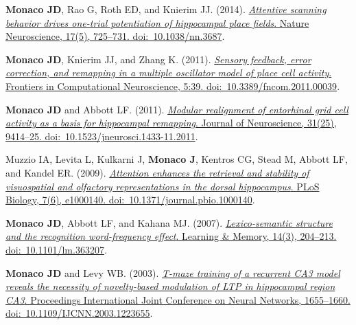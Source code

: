 \documentclass[10pt]{article}
\begin{document}
\begin{description}
\item \textbf{Monaco JD}, Rao G, Roth ED, and Knierim JJ. (2014). \href{http://dx.doi.org/10.1038/nn.3687}{\emph{Attentive scanning behavior drives one-trial potentiation of hippocampal place fields}. Nature Neuroscience, 17(5), 725--731. doi:~10.1038/nn.3687}.
\item \textbf{Monaco JD}, Knierim JJ, and Zhang K. (2011). \href{http://dx.doi.org/10.3389/fncom.2011.00039}{\emph{Sensory feedback, error correction, and remapping in a multiple oscillator model of place cell activity}. Frontiers in Computational Neuroscience, 5:39. doi:~10.3389/fncom.2011.00039}.
\item \textbf{Monaco JD} and Abbott LF. (2011). \href{http://dx.doi.org/10.1523/JNEUROSCI.1433-11.2011}{\emph{Modular realignment of entorhinal grid cell activity as a basis for hippocampal remapping}. Journal of Neuroscience, 31(25), 9414--25. doi:~10.1523/jneurosci.1433-11.2011}.
\item Muzzio IA, Levita L, Kulkarni J, \textbf{Monaco J}, Kentros CG, Stead M, Abbott LF, and Kandel ER. (2009). \href{http://dx.doi.org/10.1371/journal.pbio.1000140}{\emph{Attention enhances the retrieval and stability of visuospatial and olfactory representations in the dorsal hippocampus}. PLoS Biology, 7(6), e1000140. doi:~10.1371/journal.pbio.1000140}.
\item \textbf{Monaco JD}, Abbott LF, and Kahana MJ. (2007). \href{http://dx.doi.org/10.1101/lm.363207}{\emph{Lexico-semantic structure and the recognition word-frequency effect}. Learning \& Memory, 14(3), 204--213. doi:~10.1101/lm.363207}.
\item \textbf{Monaco JD} and Levy WB. (2003). \href{http://dx.doi.org/10.1109/IJCNN.2003.1223655}{\emph{T-maze training of a recurrent CA3 model reveals the necessity of novelty-based modulation of LTP in hippocampal region CA3}. Proceedings International Joint Conference on Neural Networks, 1655--1660. doi:~10.1109/IJCNN.2003.1223655}.
\end{description}
\end{document}
